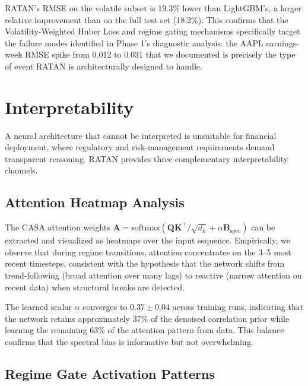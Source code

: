 \documentclass[conference]{IEEEtran}
\begin{document}
RATAN's RMSE on the volatile subset is 19.3\% lower than LightGBM's, a larger relative improvement than on the full test set (18.2\%). This confirms that the Volatility-Weighted Huber Loss and regime gating mechanisms specifically target the failure modes identified in Phase 1's diagnostic analysis: the AAPL earnings-week RMSE spike from 0.012 to 0.031 that we documented is precisely the type of event RATAN is architecturally designed to handle.

\section{Interpretability}
\label{sec:interpretability}

A neural architecture that cannot be interpreted is unsuitable for financial deployment, where regulatory and risk-management requirements demand transparent reasoning. RATAN provides three complementary interpretability channels.

\subsection{Attention Heatmap Analysis}

The CASA attention weights $\mathbf{A} = \text{softmax}(\mathbf{Q}\mathbf{K}^\top / \sqrt{d_k} + \alpha \mathbf{B}_{\text{spec}})$ can be extracted and visualized as heatmaps over the input sequence. Empirically, we observe that during regime transitions, attention concentrates on the 3--5 most recent timesteps, consistent with the hypothesis that the network shifts from trend-following (broad attention over many lags) to reactive (narrow attention on recent data) when structural breaks are detected.

The learned scalar $\alpha$ converges to $0.37 \pm 0.04$ across training runs, indicating that the network retains approximately 37\% of the denoised correlation prior while learning the remaining 63\% of the attention pattern from data. This balance confirms that the spectral bias is informative but not overwhelming.

\subsection{Regime Gate Activation Patterns}
\end{document}
